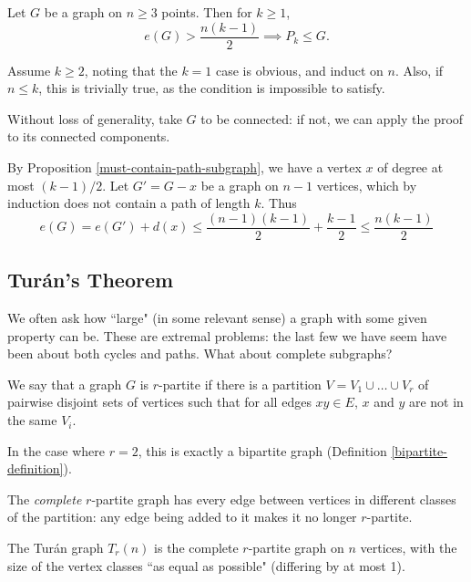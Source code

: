 \documentclass{article}
\begin{document}
\begin{theorem}
    \label{edge-condition-on-maximal-path-subgraph}
    Let $G$ be a graph on $n \geq 3$ points. Then for $k \geq 1$,
    \[
	e(G) > \frac{n(k-1)}{2} \implies P_k \leq G.
	\]
\end{theorem}

\begin{prf}
    Assume $k \geq 2$, noting that the $k=1$ case is obvious, and induct on $n$. Also, if $n \leq k$, this is trivially true, as the condition is impossible to satisfy.
    
    Without loss of generality, take $G$ to be connected: if not, we can apply the proof to its connected components.
    
    By Proposition \ref{must-contain-path-subgraph}, we have a vertex $x$ of degree at most $(k-1)/2$. Let $G' = G - x$ be a graph on $n-1$ vertices, which by induction does not contain a path of length $k$. Thus
    \[
	e(G) = e(G') + d(x) \leq \frac{(n-1)(k-1)}{2} + \frac{k-1}{2} \leq \frac{n(k-1)}{2}
	\]
\end{prf}


\subsection{Tur\'an's Theorem}

We often ask how ``large" (in some relevant sense) a graph with some given property can be. These are extremal problems: the last few we have seem have been about both cycles and paths. What about complete subgraphs?

\begin{definition}
	\label{r-partite-graph}
    We say that a graph $G$ is $r$-partite if there is a partition $V = V_1 \cup \dots \cup V_r$ of pairwise disjoint sets of vertices such that for all edges $xy \in E$, $x$ and $y$ are not in the same $V_i$.
    
    In the case where $r=2$, this is exactly a bipartite graph (Definition \ref{bipartite-definition}).
\end{definition}

\begin{definition}
    The \textit{complete} $r$-partite graph has every edge between vertices in different classes of the partition: any edge being added to it makes it no longer $r$-partite.
    
    The Tur\'an graph $T_r(n)$ is the complete $r$-partite graph on $n$ vertices, with the size of the vertex classes ``as equal as possible" (differing by at most 1).
\end{definition}
\end{document}
